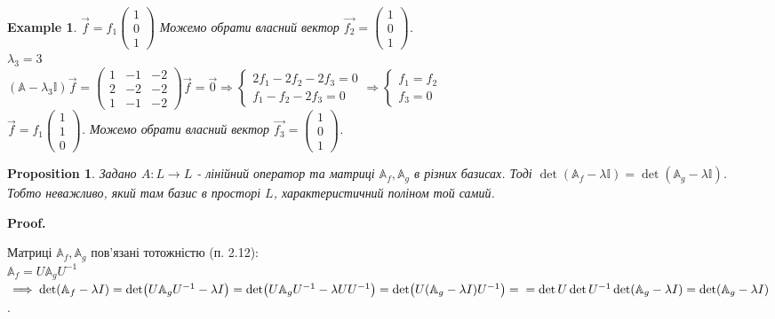 \documentclass[a4paper, 10pt]{article}
\makeatletter
\def\qed{$\blacksquare$}
\theoremstyle{theoremdd}
\theoremstyle{theoremdd}
\theoremstyle{theoremdd}
\theoremstyle{theoremdd}
\newtheorem{example}[theorem]{Example}
\theoremstyle{theoremdd}
\newtheorem{proposition}[theorem]{Proposition}
\theoremstyle{theoremdd}
\theoremstyle{theoremdd}
\theoremstyle{theoremdd}
\renewenvironment{proof}[1][Proof.\\]{\par
\pushQED{\hfill \qed}%
\normalfont \topsep6\p@\@plus6\p@\relax
\trivlist
\item\relax
{\bfseries
#1\@addpunct{.}}\hspace\labelsep\ignorespaces
}{%
\popQED\endtrivlist\@endpefalse
}
\makeatother
\begin{document}
\begin{example}
$\vec{f} = f_1 \begin{pmatrix}
1 \\ 0 \\ 1
\end{pmatrix}$ Можемо обрати власний вектор $\vec{f_2} = \begin{pmatrix}
1 \\ 0 \\ 1
\end{pmatrix}$.
\bigskip \\
$\lambda_3 = 3$\\
$(\mathbb{A} - \lambda_3 \mathbb{I})\vec{f} =\begin{pmatrix}
1 & -1 & -2 \\
2 & -2 & -2 \\
1 & -1 & -2
\end{pmatrix} \vec{f} = \vec{0} \Rightarrow \begin{cases} 2f_1 - 2f_2 - 2f_3 = 0 \\ f_1 - f_2 - 2f_3 = 0 \end{cases} \Rightarrow \begin{cases} f_1 = f_2 \\ f_3 = 0 \end{cases}$\\
$\vec{f} = f_1 \begin{pmatrix}
1 \\ 1 \\ 0
\end{pmatrix}$. Можемо обрати власний вектор $\vec{f_3} = \begin{pmatrix}
1 \\ 0 \\ 1
\end{pmatrix}$.
\end{example}

\begin{proposition}
Задано $A: L \to L$ - лінійний оператор та матриці $\mathbb{A}_f, \mathbb{A}_g$ в різних базисах. Тоді $\det(\mathbb{A}_f - \lambda \mathbb{I}) = \det(\mathbb{A}_g - \lambda \mathbb{I})$.\\
Тобто неважливо, який там базис в просторі $L$, характеристичний поліном той самий.
\end{proposition}

\begin{proof}
Матриці $\mathbb{A}_f, \mathbb{A}_g$ пов'язані тотожністю (п. 2.12):\\
$\mathbb{A}_f = U \mathbb{A}_g U^{-1}$\\
$\implies \det(\mathbb{A}_f - \lambda I) = \det(U \mathbb{A}_g U^{-1} - \lambda I) = \det(U \mathbb{A}_g U^{-1} - \lambda U U^{-1}) = \det(U(\mathbb{A}_g-\lambda I)U^{-1}) = \\ = \det U \det U^{-1} \det (\mathbb{A}_g - \lambda I) = \det (\mathbb{A}_g - \lambda I)$.
\end{proof}
\end{document}
